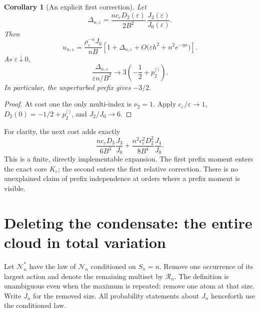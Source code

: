 \documentclass[11pt,a4paper]{article}
\newtheorem{corollary}[theorem]{Corollary}
\theoremstyle{definition}\newtheorem{definition}[theorem]{Definition}
\theoremstyle{remark}\newtheorem{remark}[theorem]{Remark}
\newcommand{\eps}{\varepsilon}
\newcommand{\1}{\mathbf 1}
\begin{document}
\begin{corollary}[An explicit first correction]\label{cor:first}
Let
\begin{equation}\label{eq:delta}
 \Delta_{n,\eps}=
 \frac{nc_{\eps}D_2(\eps)}{2B^2}\,
 \frac{J_2(\eps)}{J_0(\eps)}.
\end{equation}
Then
\begin{equation}\label{eq:first}
 u_{n,\eps}=\frac{\rho_{\eps}^{-n}J_0}{nB}
 \left[1+\Delta_{n,\eps}
 +O\bigl(\eps h^2+n^2e^{-\eta n}\bigr)\right].
\end{equation}
As $\eps\downarrow0$,
\begin{equation}\label{eq:firstlimit}
 \frac{\Delta_{n,\eps}}{\eps n/B^2}
 \longrightarrow 3\left(-\frac12+p_2^{\langle\cdot\rangle}\right).
\end{equation}
In particular, the unperturbed prefix gives $-3/2$.
\end{corollary}
\begin{proof}
At cost one the only multi-index is $\nu_2=1$. Apply
$c_{\eps}/\eps\to1$, $D_2(0)=-1/2+p_2^{\langle\cdot\rangle}$, and
$J_2/J_0\to6$.
\end{proof}

For clarity, the next cost adds exactly
\begin{equation}\label{eq:secondcost}
 \frac{nc_{\eps}D_3}{6B^3}\frac{J_3}{J_0}
 +\frac{n^2c_{\eps}^2D_2^2}{8B^4}\frac{J_4}{J_0}.
\end{equation}
This is a finite, directly implementable expansion. The first prefix
moment enters the exact core $K_{\eps}$; the second enters the first
relative correction. There is no unexplained claim of prefix
independence at orders where a prefix moment is visible.

\section{Deleting the condensate: the entire cloud in total variation}
\label{sec:deletion}

Let $\mathcal N_n^*$ have the law of $\mathcal N_n$ conditioned on
$S_n=n$. Remove one occurrence of its largest action and denote the
remaining multiset by $\mathcal R_n$. The definition is unambiguous even
when the maximum is repeated: remove one atom at that size. Write $J_n$
for the removed size. All probability statements about $J_n$ henceforth
use the conditioned law.
\end{document}
